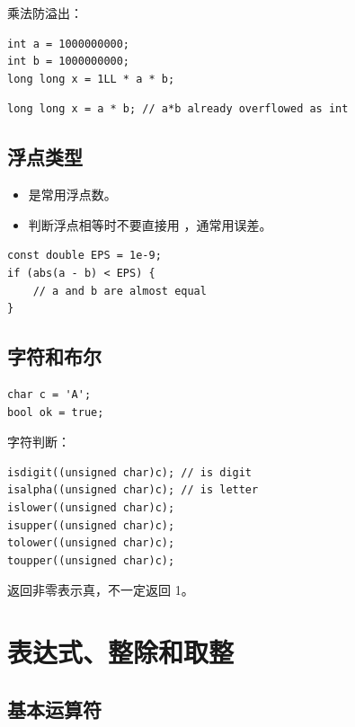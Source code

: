乘法防溢出：

\begin{lstlisting}
int a = 1000000000;
int b = 1000000000;
long long x = 1LL * a * b;
\end{lstlisting}


\begin{lstlisting}
long long x = a * b; // a*b already overflowed as int
\end{lstlisting}

\subsection{浮点类型}

\begin{itemize}
  \item {} 是常用浮点数。
  \item 判断浮点相等时不要直接用 \Code{==}，通常用误差。
\end{itemize}

\begin{lstlisting}
const double EPS = 1e-9;
if (abs(a - b) < EPS) {
    // a and b are almost equal
}
\end{lstlisting}

\subsection{字符和布尔}

\begin{lstlisting}
char c = 'A';
bool ok = true;
\end{lstlisting}

字符判断：

\begin{lstlisting}
isdigit((unsigned char)c); // is digit
isalpha((unsigned char)c); // is letter
islower((unsigned char)c);
isupper((unsigned char)c);
tolower((unsigned char)c);
toupper((unsigned char)c);
\end{lstlisting}

 返回非零表示真，不一定返回 1。

\section{表达式、整除和取整}\label{sec:04-6}

\subsection{基本运算符}

